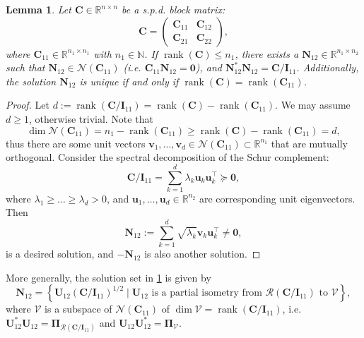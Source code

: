 \documentclass[noinfoline]{imsart}\setcounter{tocdepth}{2}
\renewcommand{\b}[1]{\mathbb{#1}} %
\newcommand{\m}[1]{\mathbf{#1}} %
\renewcommand{\c}[1]{\mathcal{#1}} %
\DeclareMathOperator*{\rk}{rank}
\theoremstyle{plain}
\newtheorem{lemma}[theorem]{Lemma}
\begin{document}
\begin{appendix}
\begin{lemma}\label{lem:Schur:root}
Let $\m{C} \in \b{R}^{n \times n}$ be a s.p.d. block matrix:
\begin{equation*}
    \m{C} = \begin{pmatrix}
    \m{C}_{11} & \m{C}_{12} \\
    \m{C}_{21} & \m{C}_{22}
    \end{pmatrix},
\end{equation*}
where $\m{C}_{11} \in \b{R}^{n_{1} \times n_{1}}$ with $n_{1} \in \b{N}$.
If $\rk (\m{C}) \le n_{1}$, there exists a $\m{N}_{12} \in \b{R}^{n_{1} \times n_{2}}$ such that $\m{N}_{12} \in \c{N}(\m{C}_{11})$ (i.e. $\m{C}_{11} \m{N}_{12} = \m{0}$), and $\m{N}_{12}^{*} \m{N}_{12} = \m{C}/\m{I}_{11}$. Additionally, the solution $\m{N}_{12}$ is unique if and only if $\rk (\m{C}) = \rk (\m{C}_{11})$.
\end{lemma}
\begin{proof}
Let $d := \rk(\m{C}/\m{I}_{11}) = \rk(\m{C}) - \rk(\m{C}_{11})$. We may assume $d \ge 1$, otherwise trivial. Note that
\begin{equation*}
    \dim \c{N}(\m{C}_{11}) = n_{1} - \rk(\m{C}_{11}) \ge \rk(\m{C}) - \rk(\m{C}_{11}) = d,
\end{equation*}
thus there are some unit vectors $\m{v}_{1}, \dots, \m{v}_{d} \in \c{N}(\m{C}_{11}) \subset \b{R}^{n_{1}}$ that are mutually orthogonal. Consider the spectral decomposition of the Schur complement:
\begin{equation*}
    \m{C}/\m{I}_{11} = \sum_{k=1}^{d} \lambda_{k} \m{u}_{k} \m{u}_{k}^{\top} \succeq \m{0},
\end{equation*}
where $\lambda_{1} \ge \dots \ge \lambda_{d} > 0$, and $\m{u}_{1}, \dots, \m{u}_{d} \in \b{R}^{n_{2}}$ are corresponding unit eigenvectors. Then
\begin{equation*}
    \m{N}_{12} := \sum_{k=1}^{d} \sqrt{\lambda_{k}} \m{v}_{k} \m{u}_{k}^{\top} \neq \m{0},
\end{equation*}
is a desired solution, and $- \m{N}_{12}$ is also another solution.
\end{proof}

More generally, the solution set in \cref{lem:Schur:root} is given by
\begin{equation*}
    \displaystyle
    \m{N}_{12} = \left\{\m{U}_{12} (\m{C}/\m{I}_{11})^{1/2} \mid \m{U}_{12} \text{ is a partial isometry from $\c{R}(\m{C}/\m{I}_{11})$ to $\mathcal{V}$} \right\},
\end{equation*}
where $\mathcal{V}$ is a subspace of $\c{N}(\m{C}_{11})$ of $\dim \mathcal{V} =  \rk(\m{C}/\m{I}_{11})$, i.e. $\m{U}_{12}^{*} \m{U}_{12} = \m{\Pi}_{\c{R}(\m{C}/\m{I}_{11})}$ and $\m{U}_{12} \m{U}_{12}^{*} = \m{\Pi}_{\mathcal{V}}$.



\end{appendix}
\end{document}
